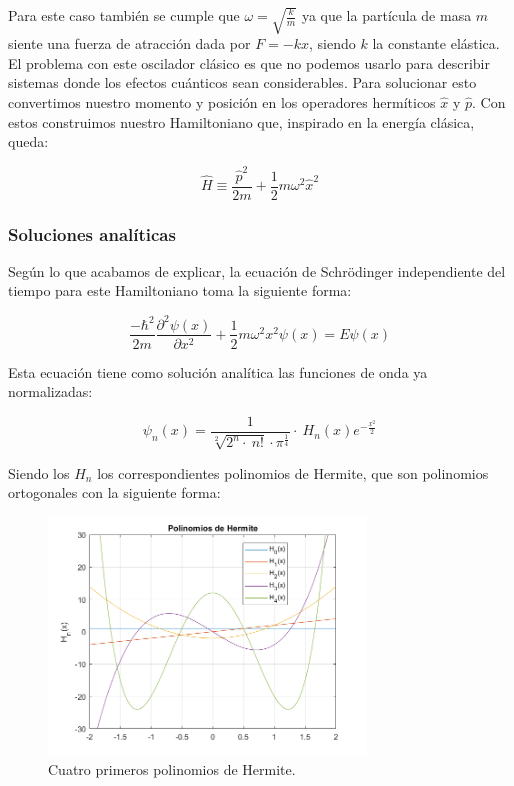 \documentclass[12pt]{article}
\begin{document}
    Para este caso también se cumple que $\omega=\sqrt{\frac{k}{m}}$ ya que la partícula de masa $m$ siente una fuerza de atracción dada por $F=-kx$, siendo $k$ la constante elástica.\\
    
    El problema con este oscilador clásico es que no podemos usarlo para describir sistemas donde los efectos cuánticos sean considerables. Para solucionar esto convertimos nuestro momento y posición en los operadores hermíticos $\hat{x}$ y $\hat{p}$. Con estos construimos nuestro Hamiltoniano que, inspirado en la energía clásica, queda:
    
    \begin{equation}
    \hat H\equiv \frac{\hat{p}^2}{2m} + \frac{1}{2}m\omega^2\hat{x}^2
    \end{equation}

    \subsubsection{Soluciones analíticas}
    Según lo que acabamos de explicar, la ecuación de Schrödinger independiente del tiempo para este Hamiltoniano toma la siguiente forma:
    
    \begin{equation}
        \frac{-\hbar^2}{2m}\frac{\partial^2\psi(x)}{\partial x^2} + \frac{1}{2}m\omega^2x^2\psi(x)=E\psi(x)
    \end{equation}
    
    Esta ecuación tiene como solución analítica las funciones de onda ya normalizadas:
    
    \begin{equation}
        \boxed{\psi _n\left(x\right)=\frac{1}{\sqrt[2]{2^n\cdot \:n!}\cdot \pi ^{\frac{1}{4}}}\cdot \:H_n\left(x\right)e^{-\frac{x^2}{2}}}
    \end{equation}
    
    Siendo los $H_n$ los correspondientes polinomios de Hermite, que son polinomios ortogonales con la siguiente forma:
    
    \begin{figure}[H]
        \centering
        \includegraphics[width=0.75\textwidth]{fotos/PolinomiosHermite.png}
        \caption{Cuatro primeros polinomios de Hermite.}
        \label{PolinomiosHermite}
    \end{figure}
    
\end{document}
